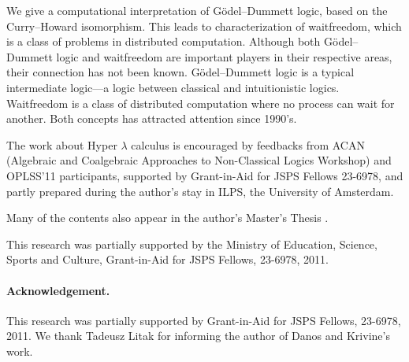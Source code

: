 \documentclass[doctor]{iscs-thesis}
\date{\fix{XXX}}
\begin{document}
\begin{eabstract}
 We give a computational interpretation of G\"odel--Dummett logic, based
 on the Curry--Howard isomorphism.  This leads to characterization
 of waitfreedom, which is a class of problems in distributed
 computation.  Although both G\"odel--Dummett logic and waitfreedom are
 important players in their respective areas, their connection has not
 been known.  G\"odel--Dummett logic is a typical intermediate logic---a
 logic between classical and intuitionistic logics.
 Waitfreedom is a class of distributed computation where no process can
 wait for another.  Both concepts has attracted attention since 1990's.
\end{eabstract}

\begin{jabstract}
 $B%
 $B$k!#$9$k$H!"J,;67W;;$NLdBj%
 $B%
 $B$3$l$i$N4XO"$O!"$3$l$^$GCN$i$l$F$$$J$+$C$?!#(B
\end{jabstract}

\maketitle

\begin{acknowledge}
The work about Hyper $\lambda$ calculus is encouraged by feedbacks from
ACAN (Algebraic and
Coalgebraic
Approaches to
Non-Classical Logics Workshop) and OPLSS'11 participants,
supported by Grant-in-Aid for JSPS Fellows 23-6978,
and partly prepared during the author's stay in
ILPS, the University of Amsterdam.


Many of the contents also appear in the author's Master's Thesis .
\end{acknowledge}

\frontmatter
\tableofcontents

\listoffigures
\listoftables

\mainmatter

%
%

%
%


This research was partially supported by the Ministry of Education,
Science, Sports and Culture, Grant-in-Aid for JSPS Fellows, 23-6978, 2011.






\paragraph{Acknowledgement.}
This research was partially supported by
Grant-in-Aid for JSPS Fellows, 23-6978, 2011.
We thank Tadeusz Litak for informing the author of
Danos and Krivine's work.

\appendix



\end{document}
